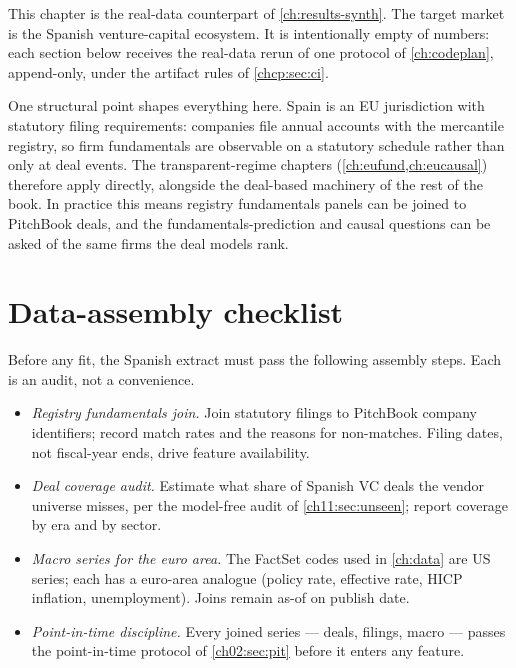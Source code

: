 
This chapter is the real-data counterpart of \cref{ch:results-synth}. The target market is the Spanish
venture-capital ecosystem. It is intentionally empty of numbers: each section below receives the
real-data rerun of one protocol of \cref{ch:codeplan}, append-only, under the artifact rules of
\cref{chcp:sec:ci}.

One structural point shapes everything here. Spain is an EU jurisdiction with statutory filing
requirements: companies file annual accounts with the mercantile registry, so firm fundamentals are
observable on a statutory schedule rather than only at deal events. The transparent-regime chapters
(\cref{ch:eufund,ch:eucausal}) therefore apply directly, alongside the deal-based machinery of the
rest of the book. In practice this means registry fundamentals panels can be joined to PitchBook
deals, and the fundamentals-prediction and causal questions can be asked of the same firms the deal
models rank.

\section{Data-assembly checklist}\label{chsp:sec:assembly}

Before any fit, the Spanish extract must pass the following assembly steps. Each is an audit, not a
convenience.

\begin{itemize}[leftmargin=2em]
\item \emph{Registry fundamentals join.} Join statutory filings to PitchBook company identifiers;
record match rates and the reasons for non-matches. Filing dates, not fiscal-year ends, drive
feature availability.
\item \emph{Deal coverage audit.} Estimate what share of Spanish VC deals the vendor universe misses,
per the model-free audit of \cref{ch11:sec:unseen}; report coverage by era and by sector.
\item \emph{Macro series for the euro area.} The FactSet codes used in \cref{ch:data} are US series;
each has a euro-area analogue (policy rate, effective rate, HICP inflation, unemployment). Joins
remain as-of on publish date.
\item \emph{Point-in-time discipline.} Every joined series --- deals, filings, macro --- passes the
point-in-time protocol of \cref{ch02:sec:pit} before it enters any feature.
\end{itemize}

